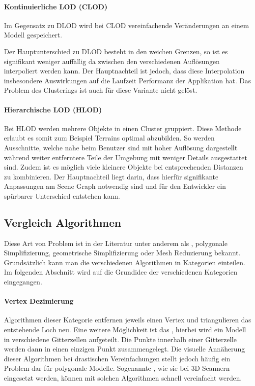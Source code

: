 \paragraph{Kontinuierliche LOD (CLOD)}
Im Gegensatz zu DLOD wird bei CLOD vereinfachende Veränderungen an einem Modell gespeichert.

Der Hauptunterschied zu DLOD besteht in den weichen Grenzen, so ist es signifikant weniger auffällig da zwischen den verschiedenen Auflösungen interpoliert werden kann.
Der Hauptnachteil ist jedoch, dass diese Interpolation insbesondere Auswirkungen auf die Laufzeit Performanz der Applikation hat.
Das Problem des Clusterings ist auch für diese Variante nicht gelöst.

\paragraph{Hierarchische LOD (HLOD)}
Bei HLOD werden mehrere Objekte in einen Cluster gruppiert.
Diese Methode erlaubt es somit zum Beispiel Terrains optimal abzubilden. So werden Ausschnitte, welche nahe beim Benutzer sind mit hoher Auflösung dargestellt während weiter entferntere Teile der Umgebung mit weniger Details ausgestattet sind.
Zudem ist es möglich viele kleinere Objekte bei entsprechenden Distanzen zu kombinieren.
Der Hauptnachteil liegt darin, dass hierfür signifikante Anpassungen am Scene Graph notwendig sind und für den Entwickler ein spürbarer Unterschied entstehen kann.

\subsection{Vergleich Algorithmen}
\label{chap:lodAlgorithmComparison}

Diese Art von Problem ist in der Literatur unter anderem als , polygonale Simplifizierung, geometrische Simplifizierung oder Mesh Reduzierung bekannt.
Grundsätzlich kann man die verschiedenen Algorithmen in Kategorien einteilen.
Im folgenden Abschnitt wird auf die Grundidee der verschiedenen Kategorien eingegangen.

\paragraph{Vertex Dezimierung}
Algorithmen dieser Kategorie entfernen jeweils einen Vertex und triangulieren das entstehende Loch neu.
Eine weitere Möglichkeit ist das , hierbei wird ein Modell in verschiedene Gitterzellen aufgeteilt. Die Punkte innerhalb einer Gitterzelle werden dann in einen einzigen Punkt zusammengelegt. Die visuelle Annäherung dieser Algorithmen bei drastischen Vereinfachungen stellt jedoch häufig ein Problem dar für polygonale Modelle. Sogenannte , wie sie bei 3D-Scannern eingesetzt werden, können mit solchen Algorithmen schnell vereinfacht werden.

